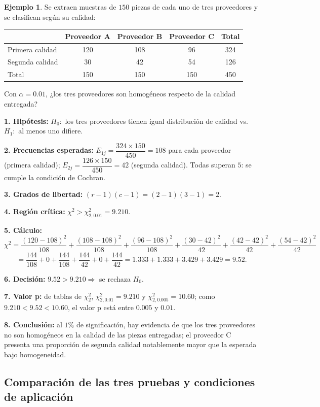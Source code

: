\documentclass[11pt,a4paper]{article}
\theoremstyle{plain}
\theoremstyle{definition}
\newtheorem{ejemplo}[teorema]{Ejemplo}
\theoremstyle{remark}
\begin{document}
\begin{ejemplo}
Se extraen muestras de $150$ piezas de cada uno de tres proveedores y se clasifican según su calidad:
\begin{center}
\begin{tabular}{@{}lccc|c@{}}
\toprule
 & Proveedor A & Proveedor B & Proveedor C & Total \\
\midrule
Primera calidad & 120 & 108 & 96 & 324 \\
Segunda calidad & 30 & 42 & 54 & 126 \\
\midrule
Total & 150 & 150 & 150 & 450 \\
\bottomrule
\end{tabular}
\end{center}
Con $\alpha=0.01$, ¿los tres proveedores son homogéneos respecto de la calidad entregada?

\textbf{1. Hipótesis:} $H_0:$ los tres proveedores tienen igual distribución de calidad vs. $H_1:$ al menos uno difiere.

\textbf{2. Frecuencias esperadas:} $E_{1j}=\dfrac{324\times150}{450}=108$ para cada proveedor (primera calidad); $E_{2j}=\dfrac{126\times150}{450}=42$ (segunda calidad). Todas superan $5$: se cumple la condición de Cochran.

\textbf{3. Grados de libertad:} $(r-1)(c-1)=(2-1)(3-1)=2$.

\textbf{4. Región crítica:} $\chi^2>\chi^2_{2,0.01}=9.210$.

\textbf{5. Cálculo:}
\[
\chi^2=\frac{(120-108)^2}{108}+\frac{(108-108)^2}{108}+\frac{(96-108)^2}{108}+\frac{(30-42)^2}{42}+\frac{(42-42)^2}{42}+\frac{(54-42)^2}{42}
\]
\[
=\frac{144}{108}+0+\frac{144}{108}+\frac{144}{42}+0+\frac{144}{42}=1.333+1.333+3.429+3.429=9.52.
\]

\textbf{6. Decisión:} $9.52>9.210\Rightarrow$ se rechaza $H_0$.

\textbf{7. Valor p:} de tablas de $\chi^2_2$, $\chi^2_{2,0.01}=9.210$ y $\chi^2_{2,0.005}=10.60$; como $9.210<9.52<10.60$, el valor p está entre $0.005$ y $0.01$.

\textbf{8. Conclusión:} al $1\%$ de significación, hay evidencia de que los tres proveedores no son homogéneos en la calidad de las piezas entregadas; el proveedor C presenta una proporción de segunda calidad notablemente mayor que la esperada bajo homogeneidad.
\end{ejemplo}

\subsection{Comparación de las tres pruebas y condiciones de aplicación}
\end{document}
